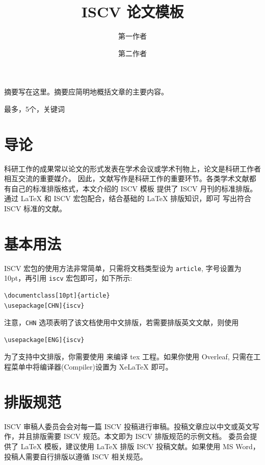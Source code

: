 \documentclass[10pt]{article}
\title{ISCV 论文模板}
\author{第一作者 \and 第二作者}
\begin{document}
\maketitle

\abstract
摘要写在这里。摘要应简明地概括文章的主要内容。

\keywords 最多，5个，关键词

\section{导论}
科研工作的成果常以论文的形式发表在学术会议或学术刊物上，论文是科研工作者相互交流的重要媒介。
因此，文献写作是科研工作的重要环节。各类学术文献都有自己的标准排版格式，本文介绍的 ISCV 模板
提供了 ISCV 月刊的标准排版。通过 \LaTeX{} 和 ISCV 宏包配合，结合基础的 \LaTeX{} 排版知识，即可
写出符合 ISCV 标准的文献。

\section{基本用法}
ISCV 宏包的使用方法非常简单，只需将文档类型设为 \texttt{article}, 字号设置为 10pt，再引用 \texttt{iscv} 宏包即可，如下所示:
\begin{verbatim}
\documentclass[10pt]{article}
\usepackage[CHN]{iscv}
\end{verbatim}
注意，\texttt{CHN} 选项表明了该文档使用中文排版，若需要排版英文文献，则使用
\begin{verbatim}
\usepackage[ENG]{iscv}
\end{verbatim}
为了支持中文排版，你需要使用  来编译 tex 工程。如果你使用 Overleaf, 只需在工程菜单中将编译器(Compiler)设置为 XeLaTeX 即可。

\section{排版规范}
ISCV 审稿人委员会会对每一篇 ISCV 投稿进行审稿。投稿文章应以中文或英文写作，并且排版需要 ISCV 规范。本文即为 ISCV 排版规范的示例文档。
委员会提供了 \LaTeX{} 模板，建议使用 \LaTeX{} 排版 ISCV 投稿文献。如果使用 MS Word，投稿人需要自行排版以遵循 ISCV 相关规范。
\end{document}

